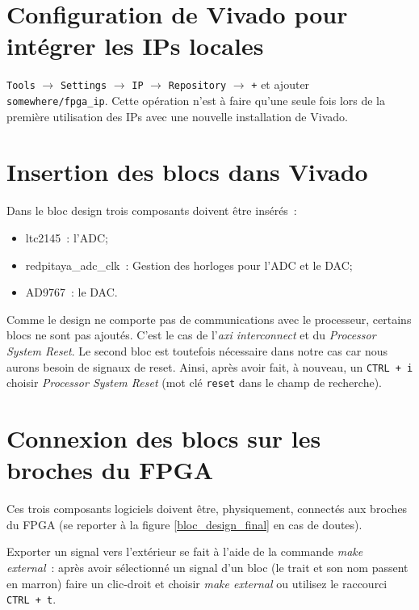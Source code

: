 \documentclass[12pt,oneside]{article}
\begin{document}
\section{Configuration de Vivado pour int\'egrer les IPs locales}

{\tt Tools} $\rightarrow$ {\tt Settings} $\rightarrow$ {\tt IP} 
$\rightarrow$ {\tt Repository} $\rightarrow$ {\tt +} et ajouter
{\tt somewhere/fpga\_ip}. Cette op\'eration n'est \`a faire qu'une seule
fois lors de la premi\`ere utilisation des IPs avec une nouvelle installation
de Vivado.

\section{Insertion des blocs dans Vivado}

Dans le bloc design trois composants doivent \^etre ins\'er\'es~:
\begin{itemize}
\item ltc2145~: l'ADC; 
\item redpitaya\_adc\_clk~: Gestion des horloges pour l'ADC et le DAC;
\item AD9767~: le DAC.
\end{itemize}

Comme le design ne comporte pas de communications avec le processeur, certains
blocs ne sont pas ajout\'es. C'est le cas de l'{\em axi interconnect} et du
{\em Processor System Reset}. Le second bloc est toutefois n\'ecessaire dans
notre cas car nous aurons besoin de signaux de reset. Ainsi, apr\`es avoir
fait, \`a nouveau, un {\tt CTRL + i} choisir {\em Processor System Reset} (mot
cl\'e {\tt reset} dans le champ de recherche).

\section{Connexion des blocs sur les broches du FPGA}

Ces trois composants logiciels doivent \^etre, physiquement, connect\'es aux
broches du FPGA (se reporter \`a la figure \ref{bloc_design_final} en cas de
doutes).

Exporter un signal vers l'ext\'erieur se fait \`a l'aide de la commande
{\em make external}~: apr\`es avoir s\'electionn\'e un signal d'un bloc (le
trait et son nom passent en marron) faire un clic-droit et choisir
{\em make external} ou utilisez le raccourci {\tt CTRL + t}.
\end{document}
